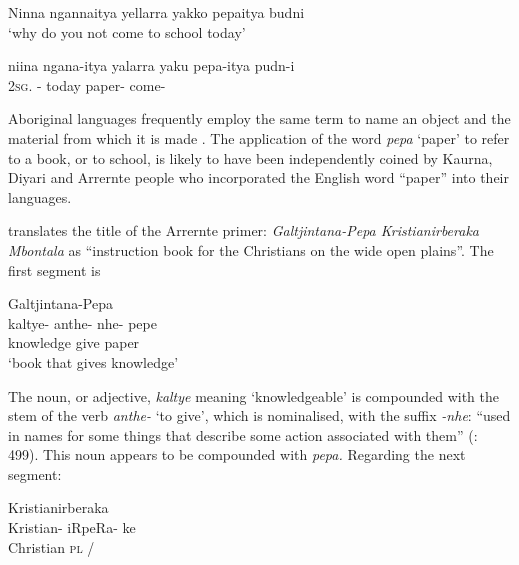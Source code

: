 \ea
 Ninna          ngannaitya           yellarra   yakko      pepaitya      budni\\
\glt `why do you not come to school today'

\citep{teichelmann_dictionary_1857}

\gll niina           ngana-itya            yalarra   yaku        pepa-itya     pudn-i\\
         2\textsc{sg}.     -     today             paper-       come-\footnotemark\\
\z

Aboriginal languages frequently employ the same term to name an object and the material from which it is made \citep[117]{dixon_languages_1980}. The application of the word \textit{pepa} `paper' to refer to a book, or to school, is likely to have been independently coined by Kaurna, Diyari and Arrernte people who incorporated the English word “paper” into their languages.

\citet[156]{graetz_open_1988} translates the title of the Arrernte primer: \textit{Galtjintana-Pepa Kristianirberaka Mbontala} as “instruction book for the Christians on the wide open plains”. The first segment is

\ea
    Galtjintana-Pepa\\
\gll kaltye-         anthe-   nhe-        pepe\\
knowledge   give           paper\\
\glt      `book that gives knowledge'
\z

The noun, or adjective, \textit{kaltye} meaning `knowledgeable' is compounded with the stem of the verb \textit{anthe-} `to give', which is nominalised, with the suffix \textit{-nhe}: “used in names for some things that describe some action associated with them” (\citealt{henderson_eastern_1994}: 499). This noun appears to be compounded with \textit{pepa.} Regarding the next segment:

\ea
Kristianirberaka\\
\gll Kristian-   iRpeRa-   ke\\
Christian   \textsc{pl}             /\\
\z

